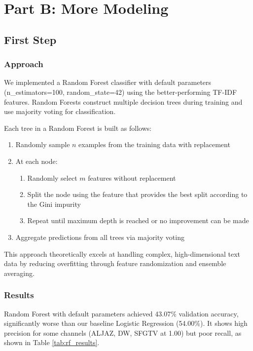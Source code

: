 \documentclass[11pt]{article}
\begin{document}
\section{Part B: More Modeling}

\subsection{First Step}

\subsubsection{Approach}

We implemented a Random Forest classifier with default parameters (n\_estimators=100, random\_state=42) using the better-performing TF-IDF features. Random Forests construct multiple decision trees during training and use majority voting for classification.

Each tree in a Random Forest is built as follows:
\begin{enumerate}
    \item Randomly sample $n$ examples from the training data with replacement
    \item At each node:
        \begin{enumerate}
            \item Randomly select $m$ features without replacement
            \item Split the node using the feature that provides the best split according to the Gini impurity
            \item Repeat until maximum depth is reached or no improvement can be made
        \end{enumerate}
    \item Aggregate predictions from all trees via majority voting
\end{enumerate}

This approach theoretically excels at handling complex, high-dimensional text data by reducing overfitting through feature randomization and ensemble averaging.

\subsubsection{Results}

Random Forest with default parameters achieved 43.07\% validation accuracy, significantly worse than our baseline Logistic Regression (54.00\%). It shows high precision for some channels (ALJAZ, DW, SFGTV at 1.00) but poor recall, as shown in Table \ref{tab:rf_results}.
\end{document}
